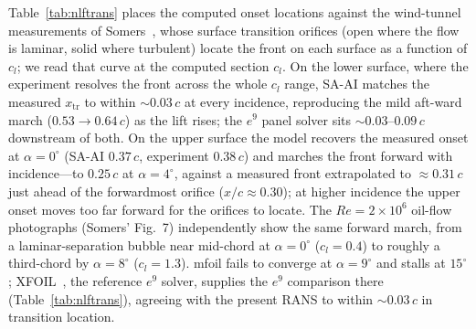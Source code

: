 \documentclass[journal]{new-aiaa}
\begin{document}
Table~\ref{tab:nlftrans} places the computed onset locations against the
wind-tunnel
measurements of Somers~\cite{somers_1981}, whose surface transition orifices
(open where the flow is laminar, solid where turbulent) locate the front on each
surface as a function of $c_l$; we read that curve at the computed section
$c_l$. On the lower surface, where the experiment resolves the front across the
whole $c_l$ range, SA-AI matches the measured $x_\mathrm{tr}$ to within
$\sim\!0.03\,c$ at every incidence, reproducing the mild aft-ward march
($0.53\!\to\!0.64\,c$) as the lift rises; the $e^9$ panel solver sits
$\sim\!0.03$--$0.09\,c$ downstream of both. On the upper surface the model
recovers the measured onset at $\alpha\!=\!0^\circ$
(SA-AI $0.37\,c$, experiment $0.38\,c$) and marches the front forward with
incidence---to $0.25\,c$ at $\alpha\!=\!4^\circ$, against a measured front
extrapolated to $\approx\!0.31\,c$ just ahead of the forwardmost orifice
($x/c\!\approx\!0.30$); at higher incidence the upper onset moves too far forward
for the orifices to locate. The $Re\!=\!2\!\times\!10^6$ oil-flow
photographs (Somers' Fig.~7) independently show the same forward march, from a
laminar-separation bubble near mid-chord at $\alpha\!=\!0^\circ$ ($c_l\!=\!0.4$)
to roughly a third-chord by $\alpha\!=\!8^\circ$ ($c_l\!=\!1.3$). mfoil fails to
converge at $\alpha\!=\!9^\circ$ and
stalls at $15^\circ$; XFOIL~\cite{drela_xfoil_1989}, the reference $e^9$ solver,
supplies the $e^9$ comparison there
(Table~\ref{tab:nlftrans}), agreeing with the present RANS
to within $\sim\!0.03\,c$ in transition location.
\end{document}
